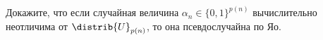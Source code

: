 Докажите, что если случайная величина $\alpha_n \in \{0, 1\}^{p(n)}$ вычислительно
неотличима от $\distrib{U}_{p(n)}$, то она псевдослучайна по Яо.